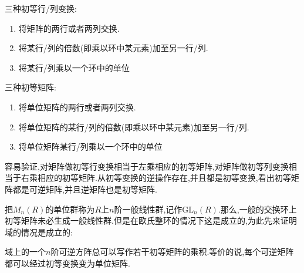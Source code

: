 三种初等行/列变换:
\begin{enumerate}
	\item 将矩阵的两行或者两列交换.
	\item 将某行/列的倍数(即乘以环中某元素)加至另一行/列.
	\item 将某行/列乘以一个环中的单位
\end{enumerate}

三种初等矩阵:
\begin{enumerate}
	\item 将单位矩阵的两行或者两列交换.
	\item 将单位矩阵的某行/列的倍数(即乘以环中某元素)加至另一行/列.
	\item 将单位矩阵某行/列乘以一个环中的单位
\end{enumerate}

容易验证,对矩阵做初等行变换相当于左乘相应的初等矩阵,对矩阵做初等列变换相当于右乘相应的初等矩阵.从初等变换的逆操作存在,并且都是初等变换,看出初等矩阵都是可逆矩阵,并且逆矩阵也是初等矩阵.

把$M_n(R)$的单位群称为$R$上$n$阶一般线性群,记作$\mathrm{GL}_n(R)$.那么,一般的交换环上初等矩阵未必生成一般线性群.但是在欧氏整环的情况下这是成立的,为此先来证明域的情况是成立的:

域上的一个$n$阶可逆方阵总可以写作若干初等矩阵的乘积.等价的说,每个可逆矩阵都可以经过初等变换变为单位矩阵.

